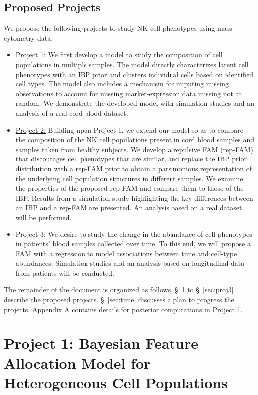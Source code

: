 \documentclass[12pt,]{article}
\begin{document}
\subsection{Proposed Projects}
We propose the following projects to study NK cell phenotypes using mass
cytometry data. 
\begin{itemize}
\item \underline{Project 1:}
We first develop a model to study the composition of cell populations in
multiple samples.  The model directly characterizes latent cell phenotypes with
an IBP prior and clusters individual cells based on identified cell types.  The
model also includes a mechanism for imputing missing observations to account
for missing marker-expression data missing not at random. We demonstrate the
developed model with simulation studies and an analysis of a real cord-blood
dataset.

\item \underline{Project 2:}
Building upon Project 1, we extend our model so as to compare the composition
of the NK cell populations present in cord blood samples and samples taken from
healthy subjects.  We develop a repulsive FAM (rep-FAM) that discourages cell
phenotypes that are similar, and replace the IBP prior distribution with a
rep-FAM prior to obtain a parsimonious representation of the underlying cell
population structures in different samples. We examine the properties of the
proposed rep-FAM and compare them to those of the IBP.  Results from a
simulation study highlighting the key differences between an IBP and a rep-FAM
are presented. An analysis based on a real dataset will be performed.

\item \underline{Project 3:}
We desire to study the change in the abundance of cell phenotypes in patients'
blood samples collected over time. To this end, we will propose a FAM with a
regression to model associations between time and cell-type abundances.
Simulation studies and an analysis based on longitudinal data from patients
will be conducted.

\end{itemize} 
The remainder of the document is organized as follows.
\S~\ref{sec:proj1} to \S~\ref{sec:proj3} describe the proposed projects.
\S~\ref{sec:time} discusses a plan to progress the projects.  
Appendix A contains details for posterior computations in Project 1.



\section{Project 1: Bayesian Feature Allocation Model for Heterogeneous Cell Populations}\label{sec:proj1}
\end{document}
